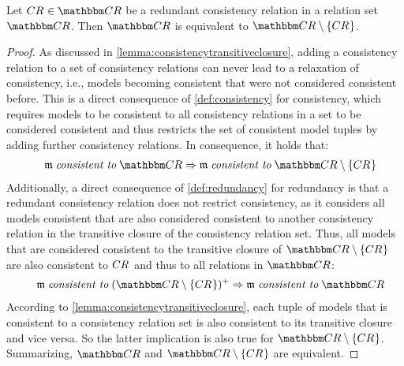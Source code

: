 
\begin{lemma} \label{lemma:redundancyimpliesequivalence}
    Let $\consistencyrelation{CR}{} \in \consistencyrelationset{CR}$ be a redundant consistency relation in a relation set $\consistencyrelationset{CR}$.
    Then $\consistencyrelationset{CR}$ is equivalent to $\consistencyrelationset{CR} \setminus \setted{\consistencyrelation{CR}{}}$.
\end{lemma}

\begin{proof}
    As discussed in \autoref{lemma:consistencytransitiveclosure}, adding a consistency relation to a set of consistency relations can never lead to a relaxation of consistency, i.e., models becoming consistent that were not considered consistent before. This is a direct consequence of \autoref{def:consistency} for consistency, which requires models to be consistent to all consistency relations in a set to be considered consistent and thus restricts the set of consistent model tuples by adding further consistency relations.
    In consequence, it holds that:
    \begin{align*}
        \formulaskip
        \modeltuple{m} \consistenttomath \consistencyrelationset{CR} \Rightarrow 
        \modeltuple{m} \consistenttomath \consistencyrelationset{CR} \setminus \setted{\consistencyrelation{CR}{}}
    \end{align*}
    Additionally, a direct consequence of \autoref{def:redundancy} for redundancy is that a redundant consistency relation does not restrict consistency, as it considers all models consistent that are also considered consistent to another consistency relation in the transitive closure of the consistency relation set. Thus, all models that are considered consistent to the transitive closure of $\consistencyrelationset{CR} \setminus \setted{\consistencyrelation{CR}{}}$ are also consistent to $\consistencyrelation{CR}{}$ and thus to all relations in $\consistencyrelationset{CR}$:
    \begin{align*}
        \formulaskip
        \modeltuple{m} \consistenttomath \transitiveclosure{(\consistencyrelationset{CR} \setminus \setted{\consistencyrelation{CR}{}})} \Rightarrow 
        \modeltuple{m} \consistenttomath \consistencyrelationset{CR}
    \end{align*}
    According to \autoref{lemma:consistencytransitiveclosure}, each tuple of models that is consistent to a consistency relation set is also consistent to its transitive closure and vice versa.
    So the latter implication is also true for $\consistencyrelationset{CR} \setminus \setted{\consistencyrelation{CR}{}}$.
    Summarizing, $\consistencyrelationset{CR}$ and $\consistencyrelationset{CR} \setminus \setted{\consistencyrelation{CR}{}}$ are equivalent.
\end{proof}

